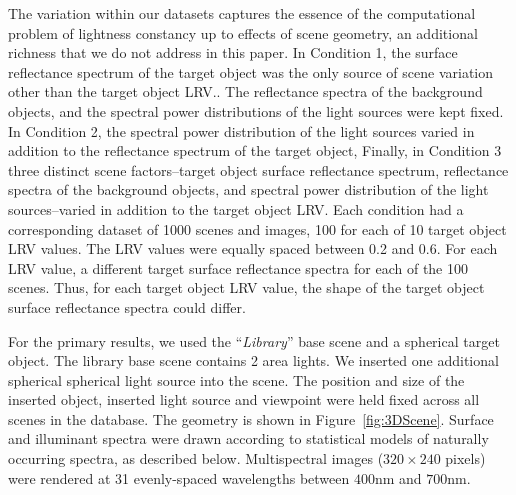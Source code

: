 \documentclass{jov}
\begin{document}
The variation within our datasets captures the essence of the computational problem of lightness constancy
up to effects of scene geometry, an additional richness that we do not address in this paper.
In Condition 1, the surface reflectance spectrum of the target object was the only source of scene variation other than the target object LRV..
The reflectance spectra of the background objects, and the spectral power distributions of the light sources were kept fixed.
In Condition 2, the spectral power distribution of the light sources varied in addition to the reflectance spectrum of the target object,
Finally, in Condition 3 three distinct scene factors--target object surface 
reflectance spectrum, reflectance spectra of the background objects, and
spectral power distribution of the light sources--varied in addition to the target object LRV.
Each condition had a corresponding dataset of 1000 scenes and images, 100 for each of 10 target object LRV values. The LRV values were equally spaced between 0.2 and 0.6. For each LRV value, a different target surface reflectance spectra for each of the 100 scenes. Thus, for each target object LRV value, the shape of the target object surface reflectance spectra could differ.

For the primary results, we used the ``{\it Library}'' base scene and a spherical target object.
The library base scene contains 2 area lights. 
We inserted one additional spherical spherical light source into the scene.
The position and size of the inserted object, inserted light source and viewpoint were held fixed across all 
scenes in the database. The geometry is shown in Figure~\ref{fig:3DScene}.
Surface and illuminant spectra were drawn according to statistical models of naturally occurring spectra, as described below.
Multispectral images ($320 \times 240$ pixels) were rendered at 31 evenly-spaced wavelengths between $400$nm and $700$nm.
\end{document}

